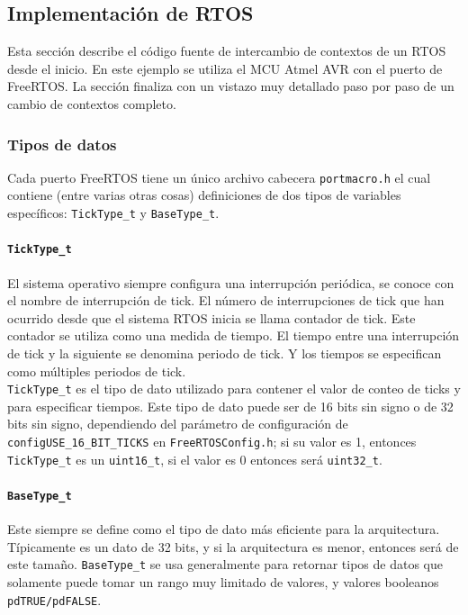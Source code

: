 \subsection{Implementación de RTOS}

Esta sección describe el código fuente de intercambio de contextos de un RTOS desde el inicio. En este ejemplo se utiliza el MCU Atmel AVR con el puerto de FreeRTOS. La sección finaliza con un vistazo muy detallado paso por paso de un cambio de contextos completo.

\subsubsection{Tipos de datos}

Cada puerto FreeRTOS tiene un único archivo cabecera \texttt{portmacro.h} el cual contiene (entre varias otras cosas) definiciones de dos tipos de variables específicos: \texttt{TickType\_t} y \texttt{BaseType\_t}.

\paragraph{\texttt{TickType\_t}}

El sistema operativo siempre configura una interrupción periódica, se conoce con el nombre de interrupción de tick. El número de interrupciones de tick que han ocurrido desde que el sistema RTOS inicia se llama contador de tick. Este contador se utiliza como una medida de tiempo. El tiempo entre una interrupción de tick y la siguiente se denomina periodo de tick. Y los tiempos se especifican como múltiples periodos de tick.\\

\texttt{TickType\_t} es el tipo de dato utilizado para contener el valor de conteo de ticks y para especificar tiempos. Este tipo de dato puede ser de 16 bits sin signo o de 32 bits sin signo, dependiendo del parámetro de configuración de \texttt{configUSE\_16\_BIT\_TICKS} en \texttt{FreeRTOSConfig.h}; si su valor es 1, entonces \texttt{TickType\_t} es un \texttt{uint16\_t}, si el valor es 0 entonces será \texttt{uint32\_t}.

\paragraph{\texttt{BaseType\_t}}

Este siempre se define como el tipo de dato más eficiente para la arquitectura. Típicamente es un dato de 32 bits, y si la arquitectura es menor, entonces será de este tamaño. \texttt{BaseType\_t} se usa generalmente para retornar tipos de datos que solamente puede tomar un rango muy limitado de valores, y valores booleanos \texttt{pdTRUE/pdFALSE}.\\

